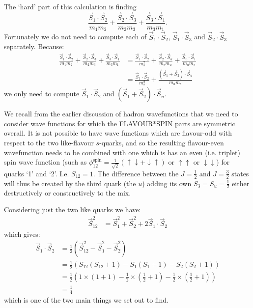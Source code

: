 \begin{allparts}
{The `hard' part of this calculation is finding 
$$
\frac{\vec S_1 \cdot \vec S_2}{m_1 m_2}
+
\frac{\vec S_2 \cdot \vec S_3}{m_2 m_3}
+
\frac{\vec S_3 \cdot \vec S_1}{m_3 m_1}.
$$
Fortunately we do not need to compute each of  $\vec S_1\cdot \vec S_2$, $\vec S_1\cdot \vec S_3$ and $\vec S_2\cdot \vec S_3$ separately.  Because:
\begin{align}
\frac{\vec S_1 \cdot \vec S_2}{m_1 m_2}
+
\frac{\vec S_2 \cdot \vec S_3}{m_2 m_3}
+
\frac{\vec S_3 \cdot \vec S_1}{m_3 m_1}
&=
\frac{\vec S_1 \cdot \vec S_2}{m_s^2}
+
\frac{\vec S_2 \cdot \vec S_u}{m_s m_u}
+
\frac{\vec S_u \cdot \vec S_1}{m_u m_s}\nonumber
\\
&=
\frac{\vec S_1 \cdot \vec S_2}{m_s^2}
+
\frac{\left(\vec S_1+\vec S_2\right) \cdot \vec S_u}{m_u m_s}\label{eq:forsubback}
\end{align}
we only need to compute $\vec S_1 \cdot \vec S_2$ and $\left(\vec S_1+\vec S_2\right) \cdot \vec S_u$.


We recall from the earlier discussion of hadron wavefunctions that we need to consider wave functions for which the FLAVOUR*SPIN parts are symmetric overall. It is not possible to have wave functions which are flavour-odd with respect to the two like-flavour $s$-quarks, and so the resulting flavour-even wavefunction needs to be combined with one which is has an even (i.e. triplet) spin wave function (such as  $\phi^{\text{spin}}_{1 2}=\frac 1 {\sqrt 2} ( \uparrow \downarrow + \downarrow \uparrow)$ or  $\uparrow\uparrow$ or $\downarrow\downarrow$) for quarks `1' and `2'.  I.e. $S_{12}=1$. The difference between the $J=\frac 1 2$ and $J=\frac 3 2$ states will thus be created by  the third quark (the $u$) adding its own $S_3=S_u=\frac 1 2$ either destructively or constructively to the mix.

Considering just the two like quarks we have:
\begin{align}
\vec S_{12}^2 
&= 
\vec S_1^2 +
\vec S_2^2 +
2\vec S_1\cdot \vec S_2
\end{align}
which gives:
\begin{align}
\vec S_1\cdot \vec S_2
&=
\frac 1 2 \left(
\vec S_{12}^2 
-
\vec S_1^2 -
\vec S_2^2 \nonumber
\right)\\
&=
\frac 1 2
\left(
S_{12}(S_{12}+1)
-
S_{1}(S_{1}+1)
-
S_{2}(S_{2}+1)\nonumber
\right)\\
&=
\frac 1 2
\left(
1
\times(1+1)
-
{\frac 1 2}\times({\frac 1 2}+1)
-
{\frac 1 2}\times({\frac 1 2}+1)
\right)\nonumber
\\
&= \frac 1 4 \label{eq:quarter}
\end{align}
which is one of the two main things we set out to find.

}
\end{allparts}

